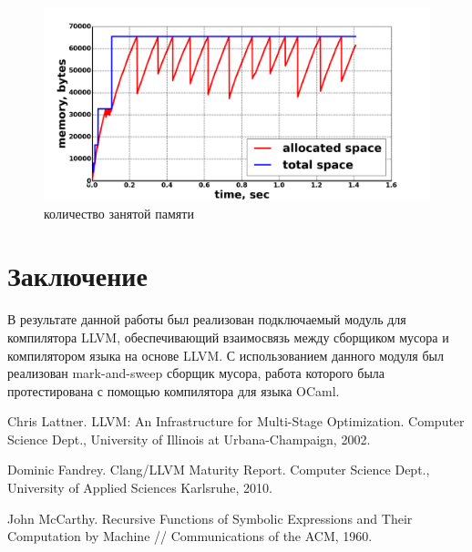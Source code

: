 \begin{figure}[H]
\caption{\label{pic:memory-with-gc}количество занятой памяти}
\includegraphics[width=1\linewidth]{Samofalov/parser-no-space.png}
\end{figure}
\section*{Заключение}
В результате данной работы был реализован подключаемый модуль для компилятора LLVM, обеспечивающий взаимосвязь между сборщиком мусора и компилятором языка на основе LLVM.  С использованием данного модуля был реализован mark-and-sweep сборщик мусора, работа которого была протестирована с помощью компилятора для языка OCaml. 

\begin{thebibliography}{99}
 Chris Lattner.
LLVM: An Infrastructure for Multi-Stage Optimization.
Computer Science Dept., University of Illinois at Urbana-Champaign, 2002.

Dominic Fandrey. Clang/LLVM Maturity Report.
Computer Science Dept., University of Applied Sciences Karlsruhe, 2010.

John McCarthy.
Recursive Functions of Symbolic Expressions and Their Computation by Machine //
Communications of the ACM, 1960.
\end{thebibliography}
